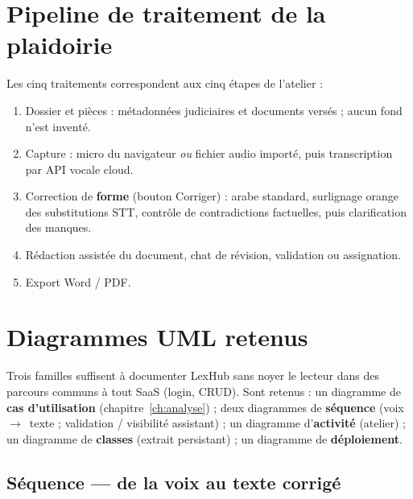 \section{Pipeline de traitement de la plaidoirie}

Les cinq traitements correspondent aux cinq étapes de l'atelier :

\begin{enumerate}[label=\textbf{P\arabic*.}]
  \item Dossier et pièces : métadonnées judiciaires et documents versés ; aucun fond n'est inventé.
  \item Capture : micro du navigateur \emph{ou} fichier audio importé, puis transcription par API vocale cloud.
  \item Correction de \textbf{forme} (bouton Corriger) : arabe standard, surlignage orange des substitutions STT, contrôle de contradictions factuelles, puis clarification des manques.
  \item Rédaction assistée du document, chat de révision, validation ou assignation.
  \item Export Word / PDF.
\end{enumerate}

\section{Diagrammes UML retenus}

Trois familles suffisent à documenter LexHub sans noyer le lecteur dans des parcours communs à tout SaaS (login, CRUD). Sont retenus : un diagramme de \textbf{cas d'utilisation} (chapitre~\ref{ch:analyse}) ; deux diagrammes de \textbf{séquence} (voix~$\rightarrow$~texte ; validation / visibilité assistant) ; un diagramme d'\textbf{activité} (atelier) ; un diagramme de \textbf{classes} (extrait persistant) ; un diagramme de \textbf{déploiement}.

\subsection{Séquence --- de la voix au texte corrigé}

